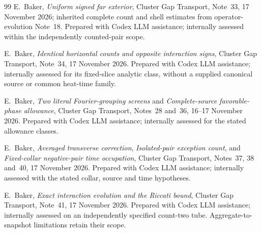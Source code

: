 \documentclass[11pt]{article}
\numberwithin{equation}{section}
\begin{document}
\begin{thebibliography}{99}
E.~Baker, \emph{Uniform signed far exterior}, Cluster Gap Transport,
Note~33, 17 November 2026; inherited complete count and shell estimates
from operator-evolution Note~18. Prepared with Codex LLM assistance;
internally assessed within the independently counted-pair scope.

E.~Baker, \emph{Identical horizontal counts and opposite interaction
signs}, Cluster Gap Transport, Note~34, 17 November 2026. Prepared with
Codex LLM assistance; internally assessed for its fixed-slice analytic
class, without a supplied canonical source or common heat-time family.

E.~Baker, \emph{Two literal Fourier-grouping screens} and
\emph{Complete-source favorable-phase allowance}, Cluster Gap Transport,
Notes~28 and~36, 16--17 November 2026. Prepared with Codex LLM assistance;
internally assessed for the stated allowance classes.

E.~Baker, \emph{Averaged transverse correction}, \emph{Isolated-pair
exception count}, and \emph{Fixed-collar negative-pair time occupation},
Cluster Gap Transport, Notes~37, 38 and~40, 17 November 2026.
Prepared with Codex LLM assistance; internally assessed with the stated
collar, source and time hypotheses.

E.~Baker, \emph{Exact interaction evolution and the Riccati bound},
Cluster Gap Transport, Note~41, 17 November 2026. Prepared with Codex
LLM assistance; internally assessed on an independently specified
count-two tube. Aggregate-to-snapshot limitations retain their scope.
\end{thebibliography}
\end{document}
